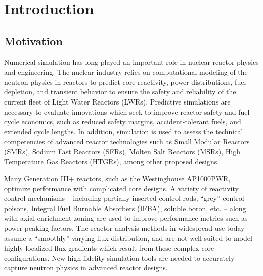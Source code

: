 \chapter{Introduction}
\label{chap:intro}

\section{Motivation}
\label{sec:chap1-motivation}


Numerical simulation has long played an important role in nuclear reactor physics and engineering. The nuclear industry relies on computational modeling of the neutron physics in reactors to predict core reactivity, power distributions, fuel depletion, and transient behavior to ensure the safety and reliability of the current fleet of Light Water Reactors (LWRs). Predictive simulations are necessary to evaluate innovations which seek to improve reactor safety and fuel cycle economics, such as reduced safety margins, accident-tolerant fuels, and extended cycle lengths. In addition, simulation is used to assess the technical competencies of advanced reactor technologies such as Small Modular Reactors (SMRs), Sodium Fast Reactors (SFRs), Molten Salt Reactors (MSRs), High Temperature Gas Reactors (HTGRs), among other proposed designs. 

Many Generation III+ reactors, such as the Westinghouse AP1000\texttrademark \ac{PWR}, optimize performance with complicated core designs. A variety of reactivity control mechanisms -- including partially-inserted control rods, ``grey'' control poisons, Integral Fuel Burnable Absorbers (IFBA), soluble boron, etc. -- along with axial enrichment zoning are used to improve performance metrics such as power peaking factors. The reactor analysis methods in widespread use today assume a ``smoothly'' varying flux distribution, and are not well-suited to model highly localized flux gradients which result from these complex core configurations. New high-fidelity simulation tools are needed to accurately capture neutron physics in advanced reactor designs.

